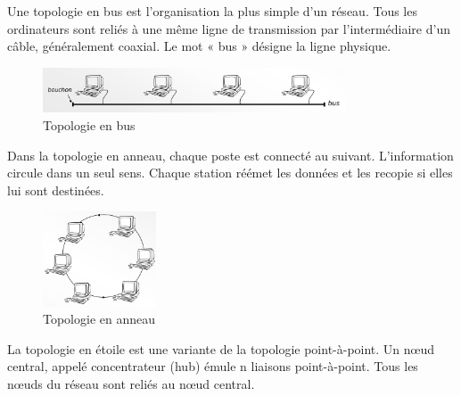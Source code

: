 \documentclass[a4paper, 9pt]{article}
\begin{document}
            \begin{description}[style=nextline]
                \item[topologie en bus:]
                Une topologie en bus est l'organisation la plus simple d'un réseau. Tous les
                ordinateurs sont reliés à une même ligne de transmission par l'intermédiaire d’un
                câble, généralement coaxial. Le mot « bus » désigne la ligne physique.
            \end{description}
            \begin{figure}[ht]
                \centering
                \includegraphics[width=0.8\textwidth]{topologie_bus.png}
                \caption{Topologie en bus}
                \label{fig:topologie_bus}
            \end{figure}
            \begin{description}[style=nextline]
                \item[topologie en anneau:]
                Dans la topologie en anneau, chaque poste est connecté au suivant.
                L’information circule dans un seul sens. Chaque station réémet les données et
                les recopie si elles lui sont destinées.
            \end{description}
            \begin{figure}[ht]
                \centering
                \includegraphics[width=0.3\textwidth]{topologie_anneau.png}
                \caption{Topologie en anneau}
                \label{fig:topologie_anneau}
            \end{figure}
            \begin{description}[style=nextline]
                \item[topologie en étoile:]
                La topologie en étoile est une variante de la topologie point-à-point. Un nœud
                central, appelé concentrateur (hub) émule n liaisons point-à-point. Tous les
                nœuds du réseau sont reliés au nœud central.
            \end{description}
\end{document}
